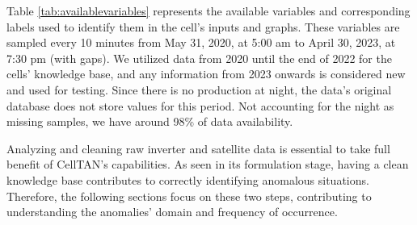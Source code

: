 \begin{table}[h!]
\caption{Available variables from two inverters and a satellite.}
\label{tab:availablevariables}
\end{table}

Table \ref{tab:availablevariables} represents the available variables and corresponding labels used to identify them in the cell's inputs and graphs. These variables are sampled every 10 minutes from May 31, 2020, at 5:00 am to April 30, 2023, at 7:30 pm (with gaps). We utilized data from 2020 until the end of 2022 for the cells' knowledge base, and any information from 2023 onwards is considered new and used for testing. Since there is no production at night, the data's original database does not store values for this period. Not accounting for the night as missing samples, we have around 98\% of data availability.

Analyzing and cleaning raw inverter and satellite data is essential to take full benefit of CellTAN's capabilities. As seen in its formulation stage, having a clean knowledge base contributes to correctly identifying anomalous situations. Therefore, the following sections focus on these two steps, contributing to understanding the anomalies' domain and frequency of occurrence.

